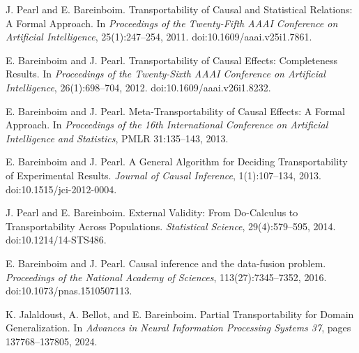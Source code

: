 %
%


J. Pearl and E. Bareinboim. Transportability of Causal and Statistical Relations: A Formal Approach. In \emph{Proceedings of the Twenty-Fifth AAAI Conference on Artificial Intelligence}, 25(1):247--254, 2011. doi:10.1609/aaai.v25i1.7861.

E. Bareinboim and J. Pearl. Transportability of Causal Effects: Completeness Results. In \emph{Proceedings of the Twenty-Sixth AAAI Conference on Artificial Intelligence}, 26(1):698--704, 2012. doi:10.1609/aaai.v26i1.8232.

E. Bareinboim and J. Pearl. Meta-Transportability of Causal Effects: A Formal Approach. In \emph{Proceedings of the 16th International Conference on Artificial Intelligence and Statistics}, PMLR 31:135--143, 2013.

E. Bareinboim and J. Pearl. A General Algorithm for Deciding Transportability of Experimental Results. \emph{Journal of Causal Inference}, 1(1):107--134, 2013. doi:10.1515/jci-2012-0004.

J. Pearl and E. Bareinboim. External Validity: From Do-Calculus to Transportability Across Populations. \emph{Statistical Science}, 29(4):579--595, 2014. doi:10.1214/14-STS486.

E. Bareinboim and J. Pearl. Causal inference and the data-fusion problem. \emph{Proceedings of the National Academy of Sciences}, 113(27):7345--7352, 2016. doi:10.1073/pnas.1510507113.

K. Jalaldoust, A. Bellot, and E. Bareinboim. Partial Transportability for Domain Generalization. In \emph{Advances in Neural Information Processing Systems 37}, pages 137768--137805, 2024.


